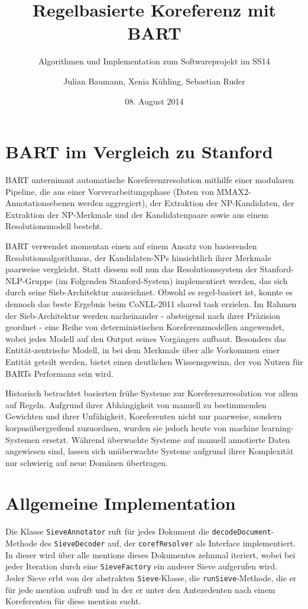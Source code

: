 \documentclass{scrartcl}
\author{Julian Baumann, Xenia Kühling, Sebastian Ruder}
\date{08. August 2014}
\title{Regelbasierte Koreferenz mit BART}
\subtitle{Algorithmen und Implementation zum Softwareprojekt im SS14}
\begin{document}
\maketitle
\section{BART im Vergleich zu Stanford}

BART unternimmt automatische Koreferenzresolution mithilfe einer modularen Pipeline, die aus einer Vorverarbeitungsphase (Daten von MMAX2-Annotationsebenen werden aggregiert), der Extraktion der NP-Kandidaten, der Extraktion der NP-Merkmale und der Kandidatenpaare sowie aus einem Resolutionsmodell besteht.

BART verwendet momentan einen auf einem Ansatz von  basierenden Resolutionsalgorithmus, der Kandidaten-NPs hinsichtlich ihrer Merkmale paarweise vergleicht. Statt diesem soll nun das Resolutionssystem der Stanford-NLP-Gruppe (im Folgenden Stanford-System) implementiert werden, das sich durch seine Sieb-Architektur auszeichnet. Obwohl es regel-basiert ist, konnte es dennoch das beste Ergebnis beim CoNLL-2011 shared task erzielen. Im Rahmen der Sieb-Architektur werden nacheinander - absteigend nach ihrer Präzision geordnet - eine Reihe von deterministischen Koreferenzmodellen angewendet, wobei jedes Modell auf den Output seines Vorgängers aufbaut. Besonders das Entität-zentrische Modell, in bei dem Merkmale über alle Vorkommen einer Entität geteilt werden, bietet einen deutlichen Wissensgewinn, der von Nutzen für BARTs Performanz sein wird.

Historisch betrachtet basierten frühe Systeme zur Koreferenzresolution vor allem auf Regeln. Aufgrund ihrer Abhängigkeit von manuell zu bestimmenden Gewichten und ihrer Unfähigkeit, Koreferenten nicht nur paarweise, sondern korpusübergreifend zuzuordnen, wurden sie jedoch heute von machine learning-Systemen ersetzt. Während überwachte Systeme auf manuell annotierte Daten angewiesen sind, lassen sich unüberwachte Systeme aufgrund ihrer Komplexität nur schwierig auf neue Domänen übertragen.

\section{Allgemeine Implementation}

Die Klasse \texttt{SieveAnnotator} ruft für jedes Dokument die \texttt{decodeDocument}-Methode des \texttt{SieveDecoder} auf, der \texttt{corefResolver} als Interface implementiert. In dieser wird über alle mentions dieses Dokumentes zehnmal iteriert, wobei bei jeder Iteration durch eine \texttt{SieveFactory} ein anderer Sieve aufgerufen wird.\\
Jeder Sieve erbt von der abstrakten \texttt{Sieve}-Klasse, die \texttt{runSieve}-Methode, die er für jede mention aufruft und in der er unter den Antezedenten nach einem Koreferenten für diese mention sucht.
\end{document}
